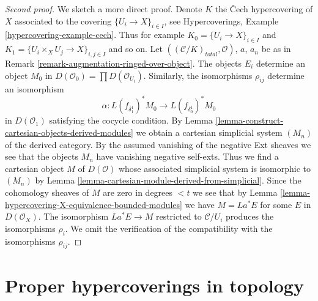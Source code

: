 \documentclass{stacks-project}
\theoremstyle{plain}
\theoremstyle{definition}
\theoremstyle{remark}
\numberwithin{equation}{subsection}
\begin{document}
\begin{proof}[Second proof]
We sketch a more direct proof.
Denote $K$ the {\v C}ech hypercovering of $X$ associated to the
covering $\{U_i \to X\}_{i \in I}$, see
Hypercoverings, Example \ref{hypercovering-example-cech}.
Thus for example $K_0 = \{U_i \to X\}_{i \in I}$ and
$K_1 = \{U_i \times_X U_j \to X\}_{i, j \in I}$ and so on.
Let $((\mathcal{C}/K)_{total}, \mathcal{O})$, $a$, $a_n$ be as in
Remark \ref{remark-augmentation-ringed-over-object}.
The objects $E_i$ determine an object $M_0$ in
$D(\mathcal{O}_0) = \prod D(\mathcal{O}_{U_i})$.
Similarly, the isomorphisms $\rho_{ij}$ determine an isomorphism
$$
\alpha :
L(f_{\delta_1^1})^*M_0
\longrightarrow
L(f_{\delta_0^1})^*M_0
$$
in $D(\mathcal{O}_1)$ satisfying the cocycle condition.
By Lemma \ref{lemma-construct-cartesian-objects-derived-modules}
we obtain a cartesian simplicial system $(M_n)$ of the derived
category. By the assumed vanishing of the negative Ext sheaves we see that
the objects $M_n$ have vanishing negative self-exts.
Thus we find a cartesian object $M$ of $D(\mathcal{O})$
whose associated simplicial system is isomorphic to $(M_n)$ by
Lemma \ref{lemma-cartesian-module-derived-from-simplicial}.
Since the cohomology sheaves of $M$ are zero in degrees $< t$
we see that by Lemma \ref{lemma-hypercovering-X-equivalence-bounded-modules}
we have $M = La^*E$ for some $E$ in $D(\mathcal{O}_X)$.
The isomorphism $La^*E \to M$ restricted to $\mathcal{C}/U_i$
produces the isomorphisms $\rho_i$. We omit the verification
of the compatibility with the isomorphisms $\rho_{ij}$.
\end{proof}












\section{Proper hypercoverings in topology}
\label{section-proper-hypercovering}
\end{document}

